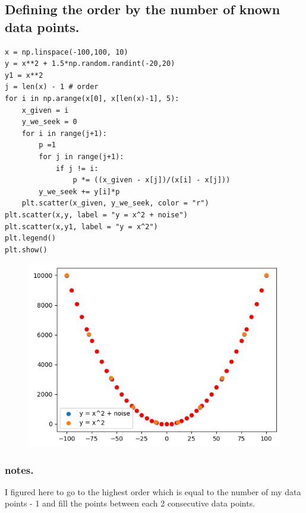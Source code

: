 \documentclass{article}
\begin{document}
\subsection{Defining the order by the number of known data points.}
\begin{verbatim}
x = np.linspace(-100,100, 10)
y = x**2 + 1.5*np.random.randint(-20,20)
y1 = x**2
j = len(x) - 1 # order
for i in np.arange(x[0], x[len(x)-1], 5):
    x_given = i
    y_we_seek = 0
    for i in range(j+1):
        p =1
        for j in range(j+1):
            if j != i:
                p *= ((x_given - x[j])/(x[i] - x[j]))
        y_we_seek += y[i]*p
    plt.scatter(x_given, y_we_seek, color = "r")
plt.scatter(x,y, label = "y = x^2 + noise")
plt.scatter(x,y1, label = "y = x^2")
plt.legend()
plt.show()
\end{verbatim}
\begin{figure}[H]
    \centering
\includegraphics[scale = 0.8]{HighOrderScatter.png}
\end{figure}
\subsubsection*{notes.} I figured here to go to the highest order which is equal to the number of my data points - 1 and fill the points between each 2 consecutive data points.
\end{document}
